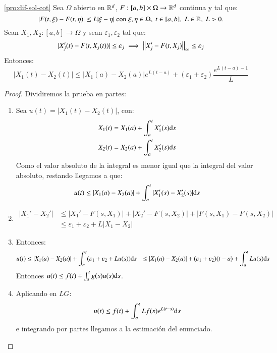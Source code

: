\begin{pro}\ref{pro:dif-sol-cot}
    Sea $\Omega$ abierto en $\mathbb{R}^d$, $F:[a, b] \times \Omega \to \mathbb{R}^d$ continua y tal que:
    $$
            |F(t, \xi) - F(t, \eta)| \leq  L |\xi - \eta| \text{ con } \xi, \eta \in \Omega,\ t\in[a, b],\ L\in \R,\ L > 0.
    $$
    Sean $X_1, X_2 :[a, b] \to \Omega$ y sean $\varepsilon_1, \varepsilon_2$ tal que:
    $$
        |X_j'(t) - F(t, X_j(t))| \leq \varepsilon_j \implies \left|\left|X'_j - F(t, X_j)\right|\right|_\infty \leq \varepsilon_j
    $$
    Entonces:
    $$
        |X_1(t) - X_2(t) | \leq |X_1(a) - X_2(a)| e^{L(t-a)} + (\varepsilon_1 + \varepsilon_2) \frac{e^{L(t-a) - 1}}{L}
    $$
\end{pro}
\begin{proof}
    Dividiremos la prueba en partes:
    \begin{enumerate}
        \item Sea $u(t) = |X_1(t) - X_2(t)|$, con:
        \begin{gather*}
            X_1(t) = X_1(a) + \int_a^t X_1'(s) \mathrm{d} s\\
            X_2(t) = X_2(a) + \int_a^t X_2'(s) \mathrm{d} s
        \end{gather*}
        Como el valor absoluto de la integral es menor igual que la integral del valor absoluto, restando llegamos a que:
        $$
            u(t) \leq |X_1(a) - X_2(a)| + \int_a^t |X_1'(s) - X_2'(s)| \mathrm{d} s
        $$
        \item
        \begin{align*}
            |X_1' - X_2'| &\leq |X_1' - F(s, X_1)| + |X_2' - F(s, X_2)| + |F(s, X_1) - F(s, X_2)|\\
            &\leq \varepsilon_1 + \varepsilon_2 + L|X_1 - X_2|
        \end{align*}
        \item Entonces:
        \begin{align*}
            u(t) &\leq |X_1(a) - X_2(a)| + \int_a^t (\varepsilon_1 + \varepsilon_2 + L u(s) ) \mathrm{d} s
                 &\leq |X_1(a) - X_2(a)| + (\varepsilon_1 + \varepsilon_2)(t-a) + \int_a^t L u(s) \mathrm{d} s
        \end{align*}
        Entonces $u(t) \leq f(t) + \int_a^t g(s) u(s) \mathrm{d} s$.
        \item Aplicando en $LG$:
        $$
            u(t) \leq f(t) + \int_a^t L f(s) e^{L(t-s)} \mathrm{d} s
        $$
        e integrando por partes llegamos a la estimación del enunciado.
    \end{enumerate}
\end{proof}

